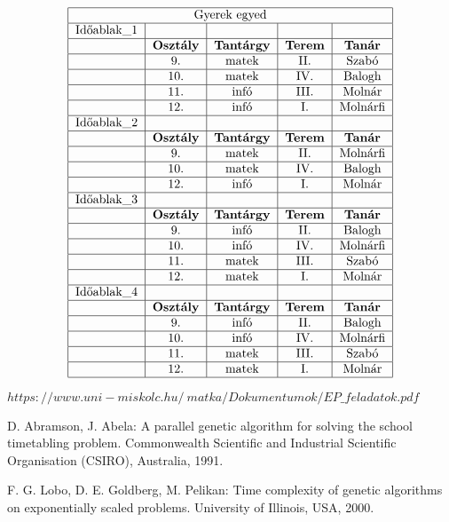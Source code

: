 \documentclass[a4paper,12pt]{article}
\begin{document}
$$
\begin{tabular}{|l|c|c|c|c|}
\hline
\multicolumn{5}{|c|}{Gyerek egyed}\\
\hline
Időablak\_1 & & & &\\
\hline
& \bf{Osztály} & \bf{Tantárgy} & \bf{Terem} & \bf{Tanár}\\
\hline
& 9. & matek & II. & Szabó\\
\hline 
& 10. & matek & IV. & Balogh\\
\hline
& 11. & infó & III. & Molnár\\
\hline
& 12. & infó & I. & Molnárfi\\
\hline
Időablak\_2 & & & &\\
\hline
& \bf{Osztály} & \bf{Tantárgy} & \bf{Terem} & \bf{Tanár}\\
\hline
& 9. & matek & II. & Molnárfi\\
\hline
& 10. & matek & IV. & Balogh\\
\hline
& 12. & infó & I. & Molnár\\
\hline
Időablak\_3 & & & &\\
\hline
& \bf{Osztály} & \bf{Tantárgy} & \bf{Terem} & \bf{Tanár}\\
\hline
& 9. & infó & II. & Balogh\\
\hline
& 10. & infó & IV. & Molnárfi\\
\hline
& 11. & matek & III. & Szabó\\
\hline
& 12. & matek & I. & Molnár\\
\hline
Időablak\_4 & & & &\\
\hline
& \bf{Osztály} & \bf{Tantárgy} & \bf{Terem} & \bf{Tanár}\\
\hline
& 9. & infó & II. & Balogh\\
\hline
& 10. & infó & IV. & Molnárfi\\
\hline
& 11. & matek & III. & Szabó\\
\hline
& 12. & matek & I. & Molnár\\
\hline
\end{tabular}
$$



\noindent [1]\quad $https://www.uni-miskolc.hu/~matka/Dokumentumok/EP\_feladatok.pdf$
 
\noindent [2]\quad D. Abramson, J. Abela: A parallel genetic algorithm for solving the school timetabling problem.
Commonwealth Scientific and Industrial Scientific Organisation (CSIRO), Australia, 1991.

\noindent [3]\quad F. G. Lobo, D. E. Goldberg, M. Pelikan: Time complexity of genetic algorithms on exponentially scaled problems.
University of Illinois, USA, 2000. 
\end{document}
